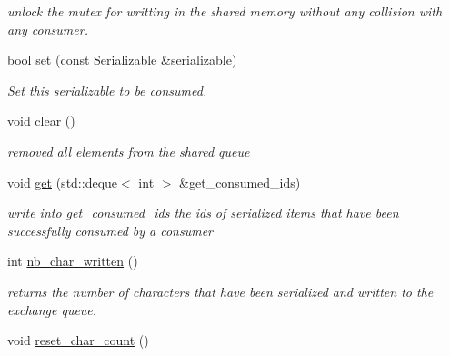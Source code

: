 \begin{DoxyCompactItemize}
\begin{DoxyCompactList}\small\item\em unlock the mutex for writting in the shared memory without any collision with any consumer. \end{DoxyCompactList}\item 
bool \hyperlink{classshared__memory_1_1Exchange__manager__producer_a0f86798dbbb5bead856c566257bd1b07}{set} (const \hyperlink{classSerializable}{Serializable} \&serializable)
\begin{DoxyCompactList}\small\item\em Set this serializable to be consumed. \end{DoxyCompactList}\item 
void \hyperlink{classshared__memory_1_1Exchange__manager__producer_a733c4c3f794e10590569f94e3f320201}{clear} ()
\begin{DoxyCompactList}\small\item\em removed all elements from the shared queue \end{DoxyCompactList}\item 
void \hyperlink{classshared__memory_1_1Exchange__manager__producer_afd8afb25d70407b785484e68d1182c0b}{get} (std\+::deque$<$ int $>$ \&get\+\_\+consumed\+\_\+ids)\hypertarget{classshared__memory_1_1Exchange__manager__producer_afd8afb25d70407b785484e68d1182c0b}{}\label{classshared__memory_1_1Exchange__manager__producer_afd8afb25d70407b785484e68d1182c0b}

\begin{DoxyCompactList}\small\item\em write into get\+\_\+consumed\+\_\+ids the ids of serialized items that have been successfully consumed by a consumer \end{DoxyCompactList}\item 
int \hyperlink{classshared__memory_1_1Exchange__manager__producer_ab31e6b87ad4c856736dec15486ed4489}{nb\+\_\+char\+\_\+written} ()
\begin{DoxyCompactList}\small\item\em returns the number of characters that have been serialized and written to the exchange queue. \end{DoxyCompactList}\item 
void \hyperlink{classshared__memory_1_1Exchange__manager__producer_a742e8859608d49901d3dafbbe08e4674}{reset\+\_\+char\+\_\+count} ()\hypertarget{classshared__memory_1_1Exchange__manager__producer_a742e8859608d49901d3dafbbe08e4674}{}\label{classshared__memory_1_1Exchange__manager__producer_a742e8859608d49901d3dafbbe08e4674}


\end{DoxyCompactItemize}
